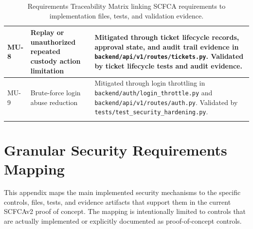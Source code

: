 \documentclass[12pt,a4paper]{report}
\begin{document}
\begin{longtable}{|p{1.1cm}|p{5.0cm}|p{9.0cm}|}
MU-8 & Replay or unauthorized repeated custody action limitation &
Mitigated through ticket lifecycle records, approval state, and audit trail evidence in \texttt{backend/api/v1/routes/tickets.py}. Validated by ticket lifecycle tests and audit evidence. \\
\hline

MU-9 & Brute-force login abuse reduction &
Mitigated through login throttling in \texttt{backend/auth/login\_throttle.py} and \texttt{backend/api/v1/routes/auth.py}. Validated by \texttt{tests/test\_security\_hardening.py}. \\
\hline

\caption{Requirements Traceability Matrix linking SCFCA requirements to implementation files, tests, and validation evidence.}
\label{tab:requirements-traceability-matrix}
\end{longtable}

\chapter{Granular Security Requirements Mapping}


This appendix maps the main implemented security mechanisms to the specific controls, files, tests, and evidence artifacts that support them in the current SCFCAv2 proof of concept. 
The mapping is intentionally limited to controls that are actually implemented or explicitly documented as proof-of-concept controls.

\begingroup
\footnotesize
\setlength{\tabcolsep}{5pt}
\setlength{\extrarowheight}{5pt}
\renewcommand{\arraystretch}{1.45}
\end{document}
